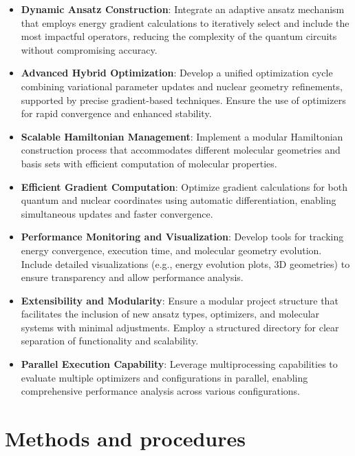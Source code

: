 \begin{itemize}
  \item \textbf{Dynamic Ansatz Construction}: Integrate an adaptive ansatz mechanism that employs energy gradient calculations to iteratively select and include the most impactful operators, reducing the complexity of the quantum circuits without compromising accuracy.
  \item \textbf{Advanced Hybrid Optimization}: Develop a unified optimization cycle combining variational parameter updates and nuclear geometry refinements, supported by precise gradient-based techniques. Ensure the use of optimizers for rapid convergence and enhanced stability.
  \item \textbf{Scalable Hamiltonian Management}: Implement a modular Hamiltonian construction process that accommodates different molecular geometries and basis sets with efficient computation of molecular properties.
  \item \textbf{Efficient Gradient Computation}: Optimize gradient calculations for both quantum and nuclear coordinates using automatic differentiation, enabling simultaneous updates and faster convergence.
  \item \textbf{Performance Monitoring and Visualization}: Develop tools for tracking energy convergence, execution time, and molecular geometry evolution. Include detailed visualizations (e.g., energy evolution plots, 3D geometries) to ensure transparency and allow performance analysis.
  \item \textbf{Extensibility and Modularity}: Ensure a modular project structure that facilitates the inclusion of new ansatz types, optimizers, and molecular systems with minimal adjustments. Employ a structured directory for clear separation of functionality and scalability.
  \item \textbf{Parallel Execution Capability}: Leverage multiprocessing capabilities to evaluate multiple optimizers and configurations in parallel, enabling comprehensive performance analysis across various configurations.
\end{itemize}


\section{Methods and procedures}

